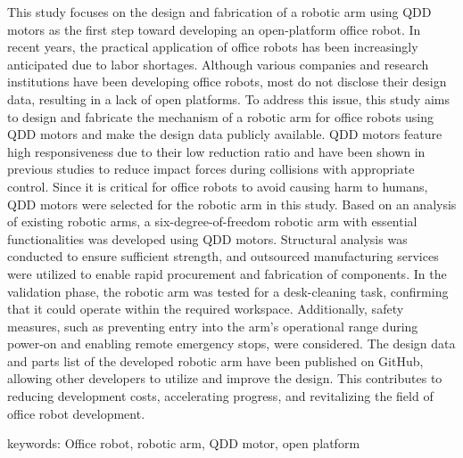 This study focuses on the design and fabrication of a robotic arm using QDD motors as the first step toward developing an open-platform office robot. In recent years, the practical application of office robots has been increasingly anticipated due to labor shortages. Although various companies and research institutions have been developing office robots, most do not disclose their design data, resulting in a lack of open platforms. To address this issue, this study aims to design and fabricate the mechanism of a robotic arm for office robots using QDD motors and make the design data publicly available. QDD motors feature high responsiveness due to their low reduction ratio and have been shown in previous studies to reduce impact forces during collisions with appropriate control. Since it is critical for office robots to avoid causing harm to humans, QDD motors were selected for the robotic arm in this study. Based on an analysis of existing robotic arms, a six-degree-of-freedom robotic arm with essential functionalities was developed using QDD motors. Structural analysis was conducted to ensure sufficient strength, and outsourced manufacturing services were utilized to enable rapid procurement and fabrication of components. In the validation phase, the robotic arm was tested for a desk-cleaning task, confirming that it could operate within the required workspace. Additionally, safety measures, such as preventing entry into the arm's operational range during power-on and enabling remote emergency stops, were considered. The design data and parts list of the developed robotic arm have been published on GitHub, allowing other developers to utilize and improve the design. This contributes to reducing development costs, accelerating progress, and revitalizing the field of office robot development.

keywords: Office robot, robotic arm, QDD motor, open platform
